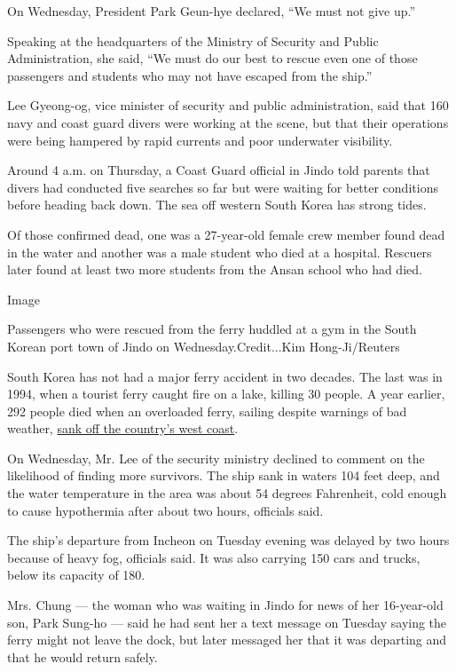 On Wednesday, President Park Geun-hye declared, ``We must not give up.''

Speaking at the headquarters of the Ministry of Security and Public
Administration, she said, ``We must do our best to rescue even one of
those passengers and students who may not have escaped from the ship.''

Lee Gyeong-og, vice minister of security and public administration, said
that 160 navy and coast guard divers were working at the scene, but that
their operations were being hampered by rapid currents and poor
underwater visibility.

Around 4 a.m. on Thursday, a Coast Guard official in Jindo told parents
that divers had conducted five searches so far but were waiting for
better conditions before heading back down. The sea off western South
Korea has strong tides.

Of those confirmed dead, one was a 27-year-old female crew member found
dead in the water and another was a male student who died at a hospital.
Rescuers later found at least two more students from the Ansan school
who had died.

Image

Passengers who were rescued from the ferry huddled at a gym in the South
Korean port town of Jindo on Wednesday.Credit...Kim Hong-Ji/Reuters

South Korea has not had a major ferry accident in two decades. The last
was in 1994, when a tourist ferry caught fire on a lake, killing 30
people. A year earlier, 292 people died when an overloaded ferry,
sailing despite warnings of bad weather,
\href{http://www.nytimes.com/1993/10/11/world/100-feared-dead-off-south-korea.html}{sank
off the country's west coast}.

On Wednesday, Mr. Lee of the security ministry declined to comment on
the likelihood of finding more survivors. The ship sank in waters 104
feet deep, and the water temperature in the area was about 54 degrees
Fahrenheit, cold enough to cause hypothermia after about two hours,
officials said.

The ship's departure from Incheon on Tuesday evening was delayed by two
hours because of heavy fog, officials said. It was also carrying 150
cars and trucks, below its capacity of 180.

Mrs. Chung --- the woman who was waiting in Jindo for news of her
16-year-old son, Park Sung-ho --- said he had sent her a text message on
Tuesday saying the ferry might not leave the dock, but later messaged
her that it was departing and that he would return safely.

